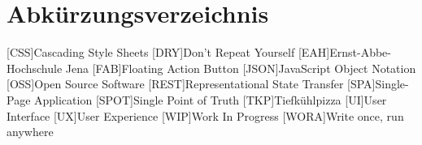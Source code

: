 \section*{Abkürzungsverzeichnis}
\begin{acronym}[xxxxxxx]\itemsep0pt
    [CSS]{Cascading Style Sheets}
    [DRY]{Don’t Repeat Yourself}
    [EAH]{Ernst-Abbe-Hochschule Jena}
    [FAB]{Floating Action Button}
    [JSON]{JavaScript Object Notation}
    [OSS]{Open Source Software}
    [REST]{Representational State Transfer}
    [SPA]{Single-Page Application}
    [SPOT]{Single Point of Truth}
    [TKP]{Tiefkühlpizza}
    [UI]{User Interface}
    [UX]{User Experience}
    [WIP]{Work In Progress}
    [WORA]{Write once, run anywhere}
\end{acronym}
